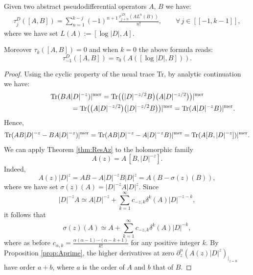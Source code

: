 \documentclass[pdftex]{sigma}
\numberwithin{equation}{section}
\begin{document}
\begin{proposition} Given two abstract pseudodifferential operators $A$, $B$ we have:
\begin{gather}\label{eq:taujDbracket}\tau_j^{D}([A,B])=\sum_{n= 1}^{k-j}
 (-1)^{n+1}\frac{\tau_{j+n}^{\vert D\vert} \left(
    A L^n(B)\right)}{n!},\qquad \forall\,
  j\in[[-1,k-1]],  \end{gather}
where we have set  $L(A):=  [\log \vert D\vert, A].$

Moreover $\tau_k([A,B])=0$ and when $k=0$ the above formula reads:
\[
\tau_{-1}^{D}([A,B ])=\tau_{0}\left( A \left([ \log
    \vert D\vert ,B] \right)\right).
    \]
\end{proposition}

\begin{proof}  Using the cyclic property of the
usual trace Tr, by analytic continuation we have:
\begin{gather*}
{\rm Tr} (B  A
  \vert D\vert^{-z} )\vert^{\rm mer} = {\rm Tr}\big(\big(\vert D\vert^{-z/2}B\big)  \big(A
  \vert D\vert^{-z/2}\big)\big)\vert^{\rm mer}\\
  \phantom{{\rm Tr} (B  A   \vert D\vert^{-z} )\vert^{\rm mer} }{}
 = {\rm Tr}\big( \big(A
  \vert D\vert^{-z/2}\big) \big( \vert D\vert^{-z/2}B\big)\big)\vert^{\rm mer}
 = {\rm Tr} ( A  \vert D\vert^{-z} B )\vert^{\rm mer}.
\end{gather*} Hence,
\begin{gather*}
{\rm Tr} ( A  B\vert D\vert^{-z}-B  A
  \vert D\vert^{-z} )\vert^{\rm mer} =  {\rm Tr} ( A  B \vert
  D\vert^{-z}-A \vert D\vert^{-z}B )\vert^{\rm mer}
 =  {\rm Tr} ( A [B ,\vert
  D\vert^{-z} ] )\vert^{\rm mer} .
\end{gather*}
We can apply Theorem \ref{thm:ResAz} to the holomorphic family
\[
A(z)= A\, [B, \vert
  D\vert^{-z}].
  \] Indeed,
\[
A(z) \vert
    D\vert^z= A  B -A \vert D\vert^{-z}B \vert
    D\vert^z= A   (B- \sigma(z)(B)),
    \]
where we have set $\sigma(z)(A)= \vert D\vert^{-z}  A \vert
    D\vert^z$. Since
    \[
    \vert D\vert^{-z} A\simeq  A  \vert D\vert^{-z}+
     \sum_{k=1}^\infty c_{-z,k}
\delta^k(A)   \vert D\vert^{-z-k},
\] it follows that
\[
\sigma(z)(A)\simeq A+ \sum_{k=1}^\infty c_{-z,k}
\delta^k(A)   \vert D\vert^{ -k},
\] where as before
 $c_{ \alpha, k}= \frac{\alpha(\alpha-1)\cdots (\alpha-k+1)}{k!}$ for any positive
 integer $k$. By
 Proposition \ref{prop:Aprime}, the  higher derivatives at zero $\partial_z^n (A(z) \vert
    D\vert^z)_{\vert_{z=0}}$  have order $a+b$, where $a$ is the order of $A$
    and $b$ that of $B$.


\end{proof}
\end{document}
